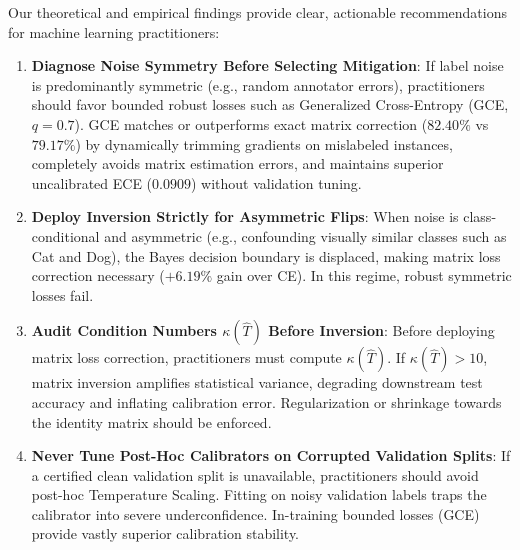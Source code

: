 \documentclass[journal]{IEEEtran}
\theoremstyle{definition}
\begin{document}
Our theoretical and empirical findings provide clear, actionable recommendations for machine learning practitioners:
\begin{enumerate}
    \item \textbf{Diagnose Noise Symmetry Before Selecting Mitigation}: If label noise is predominantly symmetric (e.g., random annotator errors), practitioners should favor bounded robust losses such as Generalized Cross-Entropy (GCE, $q=0.7$). GCE matches or outperforms exact matrix correction ($82.40\%$ vs $79.17\%$) by dynamically trimming gradients on mislabeled instances, completely avoids matrix estimation errors, and maintains superior uncalibrated ECE ($0.0909$) without validation tuning.
    \item \textbf{Deploy Inversion Strictly for Asymmetric Flips}: When noise is class-conditional and asymmetric (e.g., confounding visually similar classes such as Cat and Dog), the Bayes decision boundary is displaced, making matrix loss correction necessary ($+6.19\%$ gain over CE). In this regime, robust symmetric losses fail.
    \item \textbf{Audit Condition Numbers $\kappa(\hat{T})$ Before Inversion}: Before deploying matrix loss correction, practitioners must compute $\kappa(\hat{T})$. If $\kappa(\hat{T}) > 10$, matrix inversion amplifies statistical variance, degrading downstream test accuracy and inflating calibration error. Regularization or shrinkage towards the identity matrix should be enforced.
    \item \textbf{Never Tune Post-Hoc Calibrators on Corrupted Validation Splits}: If a certified clean validation split is unavailable, practitioners should avoid post-hoc Temperature Scaling. Fitting on noisy validation labels traps the calibrator into severe underconfidence. In-training bounded losses (GCE) provide vastly superior calibration stability.
\end{enumerate}
\end{document}
